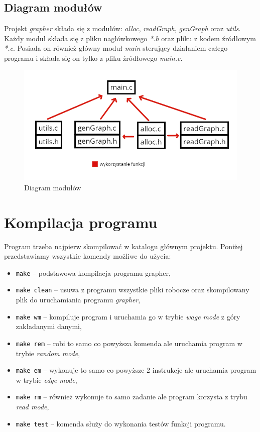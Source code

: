 \documentclass[10pt, a4paper]{report}
\begin{document}
    \subsection{Diagram modułów}
    Projekt \textit{grapher} składa się z modułów: \textit{alloc}, \textit{readGraph}, \textit{genGraph} oraz \textit{utils}. 
    Każdy moduł składa się z pliku nagłówkowego \textit{*.h} oraz pliku z kodem źródłowym \textit{*.c}.
    Posiada on również główny moduł \textit{main} sterujący działaniem całego programu i składa się on tylko z pliku źródłowego \textit{main.c}.
    \begin{figure}[h]
        \begin{center}
            \includegraphics[scale=0.6]{module_diagram_new.png}
            \caption {Diagram modułów}
        \end{center}
    \end{figure}

    \section{Kompilacja programu}
    Program trzeba najpierw skompilować w katalogu głównym projektu. Poniżej przedstawiamy wszystkie komendy możliwe do użycia:
    \begin{itemize}
        \item \texttt{make} -- podstawowa kompilacja programu grapher,
        \item \texttt{make clean} -- usuwa z programu wszystkie pliki robocze oraz skompilowany plik do uruchamiania programu \textit{grapher},
        \item \texttt{make wm} -- kompiluje program i uruchamia go w trybie \textit{wage mode} z góry zakładanymi danymi,
        \item \texttt{make rem} -- robi to samo co powyższa komenda ale uruchamia program w trybie \textit{random mode},
        \item \texttt{make em} -- wykonuje to samo co powyższe 2 instrukcje ale uruchamia program w trybie \textit{edge mode},
        \item \texttt{make rm} -- również wykonuje to samo zadanie ale program korzysta z trybu \textit{read mode},
        \item \texttt{make test} -- komenda służy do wykonania testów funkcji programu.
    \end{itemize}
\end{document}
